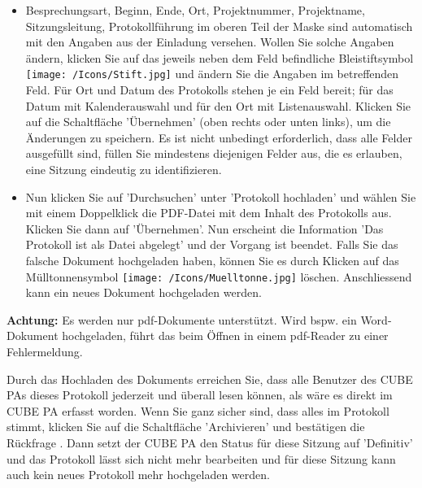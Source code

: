 \vspace{\baselineskip}

\begin{itemize}
\item
Besprechungsart, Beginn, Ende, Ort, Projektnummer, Projektname, Sitzungsleitung, Protokollführung im oberen Teil der Maske sind automatisch mit den Angaben aus der Einladung versehen. Wollen Sie solche Angaben ändern, klicken Sie auf das jeweils neben dem Feld befindliche Bleistiftsymbol \texttt{[image: /Icons/Stift.jpg]}  und ändern Sie die Angaben im betreffenden Feld. Für Ort und Datum  des Protokolls stehen je ein Feld bereit; für das Datum mit Kalenderauswahl und für den Ort mit Listenauswahl. Klicken Sie auf die Schaltfläche 'Übernehmen' (oben rechts oder unten links), um die Änderungen zu speichern. Es ist nicht unbedingt erforderlich, dass alle Felder ausgefüllt sind, füllen Sie mindestens diejenigen Felder aus, die es erlauben, eine Sitzung eindeutig zu identifizieren.
\item
Nun klicken Sie auf 'Durchsuchen'  unter 'Protokoll hochladen' und wählen Sie mit einem Doppelklick die PDF-Datei mit dem Inhalt des Protokolls aus. Klicken Sie dann auf 'Übernehmen'. Nun erscheint die Information 'Das Protokoll ist als Datei abgelegt'  und der Vorgang ist beendet. Falls Sie das falsche Dokument hochgeladen haben, können Sie es durch Klicken auf das Mülltonnensymbol \texttt{[image: /Icons/Muelltonne.jpg]} löschen. Anschliessend kann ein neues Dokument hochgeladen werden.
\end{itemize}

\vspace{\baselineskip}

\textbf{Achtung:} Es werden nur pdf-Dokumente unterstützt. Wird bspw. ein Word-Dokument hochgeladen, führt das beim Öffnen in einem pdf-Reader zu einer Fehlermeldung.

\vspace{\baselineskip}

Durch das Hochladen des Dokuments erreichen Sie, dass alle Benutzer des CUBE PAs dieses Protokoll jederzeit und überall lesen können, als wäre es direkt im CUBE PA erfasst worden. Wenn Sie ganz sicher sind, dass alles im Protokoll stimmt, klicken Sie auf die Schaltfläche 'Archivieren'  und bestätigen die Rückfrage . Dann setzt der CUBE PA den Status für diese Sitzung auf 'Definitiv' und das Protokoll lässt sich nicht mehr bearbeiten und für diese Sitzung kann auch kein neues Protokoll mehr hochgeladen werden.

